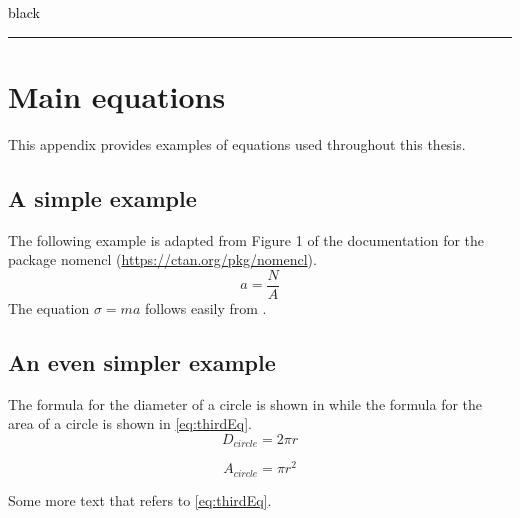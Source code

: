 \documentclass[
English,                 %
includepublications,    %
%
%
%
%
%
%
%
%
%
%
%
%
%
%
%
%
%
%
]{kththesis}
\begin{document}
\textcolor{black}{black} {\color{black} \rule{\linewidth}{1mm} }

\ifnomenclature
    \cleardoublepage
    \chapter{Main equations}
    \label{ch:NomenclatureExamples}
    This appendix provides examples of equations used throughout this thesis.
    \section{A simple example}
    The following example is adapted from Figure 1 of the documentation for the package nomencl (\url{https://ctan.org/pkg/nomencl}).
    \begin{equation}\label{eq:mainEq}
    a=\frac{N}{A}
    \end{equation}
    The equation $\sigma = m a$%
     follows easily from .

    \section{An even simpler example}
    The formula for the diameter of a circle is shown in  while the formula for the area of a circle is shown in \cref{eq:thirdEq}.
    \begin{equation}\label{eq:secondEq}
    D_{circle}=2\pi r
    \end{equation}

    \begin{equation}\label{eq:thirdEq}
    A_{circle}=\pi r^2
    \end{equation}

    Some more text that refers to \eqref{eq:thirdEq}.
\cleardoublepage
\fi  %
\end{document}

